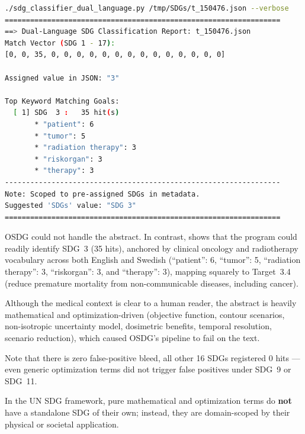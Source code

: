 \begin{casestudySection}
\begin{lstlisting}[language={bash}, basicstyle=\footnotesize, escapechar=|, breaklines=true,
    postbreak=\usebox{\lstbreakbox}, caption={Program's output}, label=lst:t_150476Output]
./sdg_classifier_dual_language.py /tmp/SDGs/t_150476.json --verbose
=================================================================
==> Dual-Language SDG Classification Report: t_150476.json
Match Vector (SDG 1 - 17):
[0, 0, 35, 0, 0, 0, 0, 0, 0, 0, 0, 0, 0, 0, 0, 0, 0]

Assigned value in JSON: "3"

Top Keyword Matching Goals:
  [ 1] SDG  3 :   35 hit(s)
       * "patient": 6
       * "tumor": 5
       * "radiation therapy": 3
       * "riskorgan": 3
       * "therapy": 3
-----------------------------------------------------------------
Note: Scoped to pre-assigned SDGs in metadata.
Suggested 'SDGs' value: "SDG 3"
=================================================================
\end{lstlisting}

OSDG could not handle the abstract. In contrast,  shows that the program could readily identify \gls{SDG}~3 (\num{35} hits), anchored by clinical oncology and radiotherapy vocabulary across both English and Swedish (\enquote{patient}: 6, \enquote{tumor}: 5, \enquote{radiation therapy}: 3, \enquote{\foreignlanguage{swedish}{riskorgan}}: 3, and \enquote{therapy}: 3), mapping squarely to Target~3.4 (reduce premature mortality from non-communicable diseases, including cancer).

Although the medical context is clear to a human reader, the abstract is heavily mathematical and optimization-driven (objective function, contour scenarios, non-isotropic uncertainty model, dosimetric benefits, temporal resolution, scenario reduction), which caused OSDG's pipeline to fail on the text.

Note that there is zero false-positive bleed, \ie all other \num{16} \glspl{SDG} registered \num{0} hits --- even generic optimization terms did not trigger false positives under \gls{SDG}~9 or \gls{SDG}~11.
\end{casestudySection}

\begin{takeaway}
In the UN \gls{SDG} framework, pure mathematical and optimization terms do \textbf{not} have a standalone \gls{SDG} of their own; instead, they are domain-scoped by their physical or societal application.
\end{takeaway}


